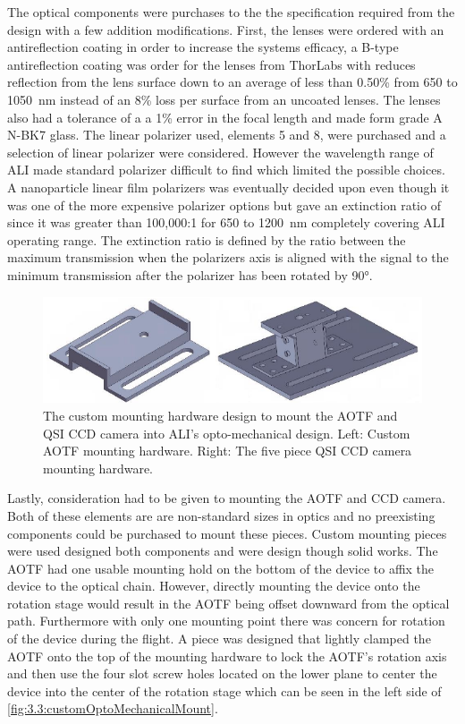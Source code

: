 The optical components were purchases to the the specification required from the design with a few addition modifications. First, the lenses were ordered with an antireflection coating in order to increase the systems efficacy, a B-type antireflection coating was order for the lenses from ThorLabs with reduces reflection from the lens surface down to an average of less than 0.50\% from 650 to 1050~nm instead of an 8\% loss per surface from an uncoated lenses. The lenses also had a tolerance of a a 1\% error in the focal length and made form grade A N-BK7 glass. The linear polarizer used, elements 5 and 8, were purchased and a selection of linear polarizer were considered. However the wavelength range of ALI made standard polarizer difficult to find which limited the possible choices. A nanoparticle linear film polarizers was eventually decided upon even though it was one of the more expensive polarizer options but gave an extinction ratio of since it was greater than 100,000:1 for 650 to 1200~nm completely covering ALI operating range. The extinction ratio is defined by the ratio between the maximum transmission when the polarizers axis is aligned with the signal to the minimum transmission after the polarizer has been rotated by 90\si{\degree}.

\begin{figure}
        \includegraphics[width=1.0\textwidth]{./Images/3-3-CustomMountingPieces.pdf}
        \caption[ALI Custom Mounting Hardware]{The custom mounting hardware design to mount the AOTF and QSI CCD camera into ALI's opto-mechanical design. Left: Custom AOTF mounting hardware. Right: The five piece QSI CCD camera mounting hardware.}
        \label{fig:3.3:customOptoMechanicalMount}
\end{figure}

Lastly, consideration had to be given to mounting the AOTF and CCD camera. Both of these elements are are non-standard sizes in optics and no preexisting components could be purchased to mount these pieces. Custom mounting pieces were used designed both components and were design though solid works. The AOTF had one usable mounting hold on the bottom of the device to affix the device to the optical chain. However, directly mounting the device onto the rotation stage would result in the AOTF being offset downward from the optical path. Furthermore with only one mounting point there was concern for rotation of the device during the flight. A piece was designed that lightly clamped the AOTF onto the top of the mounting hardware to lock the AOTF's rotation axis and then use the four slot screw holes located on the lower plane to center the device into the center of the rotation stage which can be seen in the left side of \autoref{fig:3.3:customOptoMechanicalMount}.

